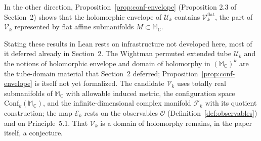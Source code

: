 In the other direction, Proposition~\ref{prop:conf-envelope} (Proposition 2.3 of
Section~2) shows that the holomorphic envelope of $\mathcal U_k$ contains
$\mathcal V_k^{\mathrm{flat}}$, the part of $\mathcal V_k$ represented by flat affine
submanifolds $M \subset \mathbb M_{\mathbb C}$.

Stating these results in Lean rests on infrastructure not developed here, most of it
deferred already in Section~2. The Wightman permuted extended tube $\mathcal U_k$ and
the notions of holomorphic envelope and domain of holomorphy in
$(\mathbb M_{\mathbb C})^k$ are the tube-domain material that Section~2 deferred;
Proposition~\ref{prop:conf-envelope} is itself not yet formalized. The candidate
$\mathcal V_k$ uses totally real submanifolds of $\mathbb M_{\mathbb C}$ with allowable
induced metric, the configuration space $\mathrm{Conf}_k(\mathbb M_{\mathbb C})$, and
the infinite-dimensional complex manifold $\mathcal F_k$ with its quotient
construction; the map $\mathcal E_k$ rests on the observables $\mathcal O$
(Definition~\ref{def:observables}) and on Principle~5.1. That $\mathcal V_k$ is a
domain of holomorphy remains, in the paper itself, a conjecture.
